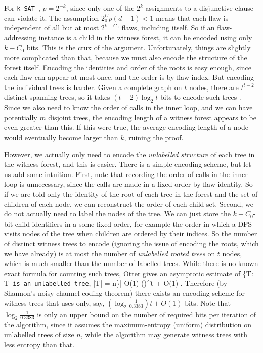 \documentclass[twocolumn]{article}
\newcommand{\ksat}{\texttt{k-SAT}~}
\def\seqn#1\eeqn{\begin{align}#1\end{align}}
\begin{document}
For \ksat, $p = 2^{-k}$, since only one of the $2^k$ assignments to a disjunctive clause can violate it.  The assumption $2^C_0 p (d+1) < 1$ means that each flaw is independent of all but at most $2^{k-C_0}$ flaws, including itself.  So if an flaw-addressing instance is a child in the witness forest, it can be encoded using only $k-C_0$ bits.  This is the crux of the argument.  Unfortunately, things are slightly more complicated than that, because we must also encode the structure of the forest itself.  Encoding the identities and order of the roots is easy enough, since each flaw can appear at most once, and the order is by flaw index.  But encoding the individual trees is harder.  Given a complete graph on $t$ nodes, there are $t^{t-2}$ distinct spanning trees, so it takes $(t-2) \log_2 t$ bits to encode such trees \cite{prufer1918neuer,neville1953codifying}.  Since we also need to know the order of calls in the inner loop, and we can have potentially $m$ disjoint trees, the encoding length of a witness forest appears to be even greater than this.  If this were true, the average encoding length of a node would eventually become larger than $k$, ruining the proof.

However, we actually only need to encode the \emph{unlabelled structure} of each tree in the witness forest, and this is easier.  There is a simple encoding scheme, but let us add some intuition.  First, note that recording the order of calls in the inner loop is unnecessary, since the calls are made in a fixed order by flaw identity.  So if we are told only the identity of the root of each tree in the forest and the set of children of each node, we can reconstruct the order of each child set.  %
Second, we do not actually need to label the nodes of the tree.  We can just store the $k-C_0$-bit child identifiers in a some fixed order, for example the order in which a DFS visits nodes of the tree when children are ordered by their indices. %
So the number of distinct witness trees to encode (ignoring the issue of encoding the roots, which we have already) is at most the number of \emph{unlabelled rooted trees} on $t$ nodes, which is much smaller than the number of labelled trees.  While there is no known exact formula for counting such trees, Otter \cite{otter1948number} gives an asymptotic estimate of
\seqn
  |\{T: T\texttt{ is an unlabelled tree}, |T| = n\}| \tilde O(1) ()^t + O(1) .
\eeqn
Therefore (by Shannon's noisy channel coding theorem) there exists an encoding scheme for witness trees that uses only, say, $(\log_2 \frac{1}{0.3383}) t + O(1)$ bits.  Note that $\log_2 \frac{1}{0.3383}$ is only an upper bound on the number of required bits per iteration of the algorithm, since it assumes the maximum-entropy (uniform) distribution on unlabelled trees of size $n$, while the algorithm may generate witness trees with less entropy than that.
\end{document}
